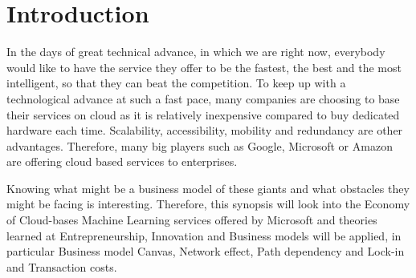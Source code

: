 \section{Introduction}

In the days of great technical advance, in which we are right now, everybody would like to have the service they offer to be the fastest, the best and the most intelligent, so that they can beat the competition. To keep up with a technological advance at such a fast pace, many companies are choosing to base their services on cloud as it is relatively inexpensive compared to buy dedicated hardware each time. Scalability, accessibility, mobility and redundancy are other advantages. Therefore, many big players such as Google, Microsoft or Amazon are offering cloud based services to enterprises.

Knowing what might be a business model of these giants and what obstacles they might be facing is interesting. Therefore, this synopsis will look into the Economy of Cloud-bases Machine Learning services offered by Microsoft and theories learned at Entrepreneurship, Innovation and Business models will be applied, in particular Business model Canvas, Network effect, Path dependency and Lock-in and Transaction costs.

% 
